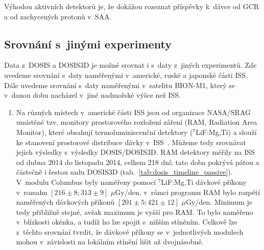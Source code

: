 Výhodou aktivních detektorů je, že dokážou rozeznat příspěvky k~dávce od GCR a od zachycených protonů v~SAA.
\subsection{Srovnání s~jinými experimenty}
Data z~DOSIS a DOSIS3D je možné srovnat i s~daty z~jiných experimentů. Zde uvedeme srovnání s~daty naměřenými v~americké, ruské a japonské části ISS. Dále uvedeme srovnání s~daty naměřenými v~satelitu BION-M1, který se v~danou dobu nacházel v~jiné nadmořské výšce než ISS.
\begin{enumerate}
\item Na různých místech v~americké části ISS jsou od organizace NASA/SRAG umístěné tzv. monitory prostorového rozložení záření (RAM, Radiation Area Monitor), které obsahují termoluminiscenční detektory ($^7$LiF:Mg,Ti) a slouží ke stanovení prostorové distribuce dávky v~ISS~\cite{RAM}. Můžeme tedy srovnávat jejich výsledky s~výsledky DOSIS/DOSIS3D. RAM detektory měřily na ISS od dubna 2014 do listopadu 2014, celkem 218 dní; tato doba pokrývá pátou a částečně i šestou sadu DOSIS3D (tab.~\ref{tab:dosis_timeline_passive}). V~modulu Columbus byly naměřeny pomocí $^7$LiF:Mg,Ti dávkové příkony v~rozsahu $[216\pm8;313\pm9]$ $\mu$Gy/den, v~rámci programu RAM bylo rozpětí naměřených dávkových příkonů $[201\pm5;421\pm12]$ $\mu$Gy/den. Minimum je tedy přibližně stejné, avšak maximum je vyšší pro RAM. To bylo naměřeno
v~blízkosti okénka, a tudíž ho lze spojit s~nižším stíněním. Celkově lze z~těchto srovnání tvrdit, že dávkové příkony se v~jednotlivých modulech mohou v~závislosti na lokálním stínění lišit až dvojnásobně.~\cite{dosis}


\end{enumerate}
